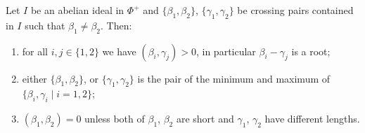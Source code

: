\documentclass[ALCO,published]{cedram}
\theoremstyle{plain}
\newcommand\be{\beta}
\newcommand\ga{\gamma}
\begin{document}
\begin{pro}\label{pro:vert-comparable}
Let $I$ be an abelian ideal in $\Phi^+$ and $\{\be_1, \be_2\}$,  $\{\ga_1, \ga_2\}$ be crossing pairs contained in $I$ such that $\be_1\ne \be_2$.
Then:
\begin{enumerate}
\item
for all $i,j\in \{1, 2\}$ we have $(\be_i, \ga_j)> 0$, in particular $\be_i-\ga_j$ is a root; 
\label{itm:edges-are-roots}
\item 
either $\{\be_1, \be_2\}$, or $\{\ga_1, \ga_2\}$ is the pair of the minimum and maximum of $\{\be_i, \ga_i\mid i=1,2\}$;
\label{itm:ordine}
\item 
$(\be_1, \be_2)=0$ unless both of $\be_1$, $\be_2$ are short and $\ga_1$, $\ga_2$ have different lengths.
\label{itm:opposti-ortogonali}
\end{enumerate}
\end{pro}
\end{document}
